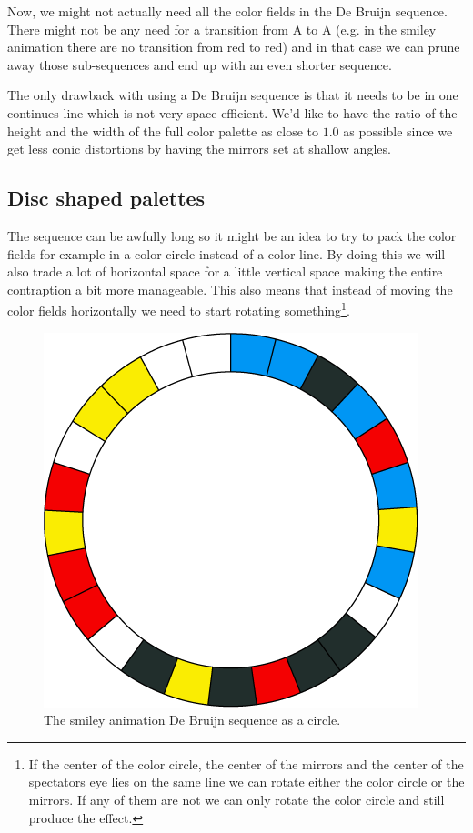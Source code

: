 \documentclass{article}
\begin{document}
Now, we might not actually need all the color fields in the De Bruijn
sequence. There might not be any need for a transition from A to A (e.g.
in the smiley animation there are no transition from red to red) and in
that case we can prune away those sub-sequences and end up with an even
shorter sequence.

The only drawback with using a De Bruijn sequence is that it needs to be
in one continues line which is not very space efficient. We'd like to
have the ratio of the height and the width of the full color palette as
close to \(1.0\) as possible since we get less conic distortions by
having the mirrors set at shallow angles.

\subsection{Disc shaped palettes}

The sequence can be awfully long so it might be an idea to try to pack
the color fields for example in a color circle instead of a color line.
By doing this we will also trade a lot of horizontal space for a little
vertical space making the entire contraption a bit more manageable. This
also means that instead of moving the color fields horizontally we need
to start rotating something\footnote{If the center of the color circle,
  the center of the mirrors and the center of the spectators eye lies on
  the same line we can rotate either the color circle or the mirrors. If
  any of them are not we can only rotate the color circle and still
  produce the effect.}.

\begin{figure}[ht!]
\centering
\includegraphics{images/debruijn-wheel.png}
\caption{The smiley animation De Bruijn sequence as a circle.}
\end{figure}
\end{document}
